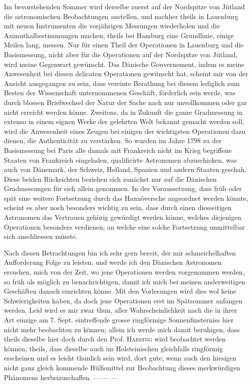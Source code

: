 \par{}%
Im bevorstehenden Sommer wird derselbe zuerst auf der Nordspitze von Jütland die astronomischen Beobachtungen anstellen, und nachher theils in Lauenburg mit neuen Instrumenten die vorjährigen Messungen wiederholen und die Azimuthalbestimmungen machen, theils bei Hamburg eine Grundlinie, einige Meilen lang, messen. Nur für einen Theil der Operationen in Lauenburg und die Basismessung, nicht aber für die Operationen auf der Nordspitze von Jütland, wird meine Gegenwart gewünscht. Das Dänische Gouvernement, indem es meine Anwesenheit bei diesen delicaten Operationen gewünscht hat, scheint mir von der Ansicht ausgegangen zu sein, dass vereinte Berathung bei diesem lediglich zum Besten der Wissenschaft unternommenen Geschäft, förderlich sein werde, was durch blossen Briefwechsel der Natur der Sache nach nur unvollkommen oder gar nicht erreicht werden könne. Zweitens, da in Zukunft die ganze Gradmessung in extenso in einem eignen Werke der gelehrten Welt bekannt gemacht werden soll, wird die Anwesenheit eines Zeugen bei einigen der wichtigsten Operationen dazu dienen, die Authenticität zu verstärken. So wurden im Jahre 1798 zu der Basismessung bei Paris alle damals mit Frankreich nicht im Krieg begriffene Staaten von Frankreich eingeladen, qualificirte Astronomen abzuschicken, was auch von Dänemark, der Schweiz, Holland, Spanien und andern Staaten geschah. Diese beiden Rücksichten beziehen sich zunächst nur auf die Dänischen Gradmessungen für sich allein genommen. In der Voraussetzung, dass früh oder spät eine weitere Fortsetzung durch das Hannöversche angeordnet werden könnte, scheint es aber noch besonders wichtig zu sein, dass durch einen diesseitigen Astronomen das Vertrauen gehörig gewürdigt werden könne, welches diejenigen Operationen besonders verdienen, an welche eine solche Fortsetzung unmittelbar sich anschliessen müsste.

Nach diesen Betrachtungen bin ich sehr gern bereit, der mir schmeichelhaften Aufforderung Folge zu leisten, und werde ich den Dänischen Astronomen ersuchen, mich von der Zeit, wo jene Operationen werden vorgenommen werden, so früh als möglich zu benachrichtigen, damit ich mich bei meinen anderweitigen Geschäften danach einrichten könne. Mit den Vorlesungen wird dies wol keine Schwierigkeiten haben, da doch jene Operationen erst im Spätsommer anfangen werden. Leid wird es mir zwar thun, aller Wahrscheinlichkeit nach die in ihrer Art einzige am 7. Sept. eintreffende grosse ringförmige Sonnenfinsterniss hier nicht mehr beobachten zu können; allein ich werde mich damit beruhigen, dass theils dieselbe hier doch durch den Prof. \textsc{Harding} wird beobachtet werden können, theils, dass dieselbe auch im Holsteinischen gleichfalls ringförmig erscheinen und es leicht thunlich sein wird, dort gute, wenn auch den hiesigen nicht ganz gleich kommende Hülfsmittel zur Beobachtung dieses merkwürdigen Phänomens herbeizuschaffen. — — —

